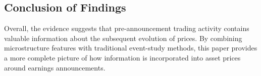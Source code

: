 \subsection{Conclusion of Findings}

Overall, the evidence suggests that pre-announcement trading activity contains valuable information about the subsequent evolution of prices. By combining microstructure features with traditional event-study methods, this paper provides a more complete picture of how information is incorporated into asset prices around earnings announcements.


